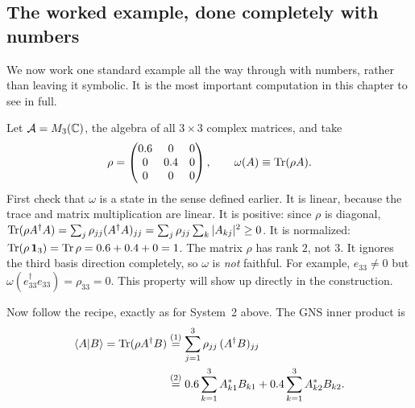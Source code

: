 \subsection*{The worked example, done completely with numbers}

We now work one standard example all the way through with numbers, rather than leaving it symbolic. It is
the most important computation in this chapter to see in full.

Let $\mathcal{A}=M_3(\mathbb C)$, the algebra of all $3\times3$ complex matrices, and take
\[
\rho = \begin{pmatrix}0.6&0&0\\0&0.4&0\\0&0&0\end{pmatrix} , \qquad \omega(A)\equiv\operatorname{Tr}(\rho A).
\]
First check that $\omega$ is a state in the sense defined earlier. It is linear, because the trace and matrix
multiplication are linear. It is positive: since $\rho$ is diagonal,
$\operatorname{Tr}(\rho A^\dagger A)=\sum_j\rho_{jj}(A^\dagger A)_{jj}=\sum_j\rho_{jj}\sum_k|A_{kj}|^2\ge0$. It is normalized:
$\operatorname{Tr}(\rho\,\mathbf{1}_3)=\operatorname{Tr}\rho=0.6+0.4+0=1$. The matrix $\rho$ has rank $2$, not $3$. It ignores the third basis
direction completely, so $\omega$ is \emph{not} faithful. For example, $e_{33}\ne0$ but
$\omega(e_{33}^\dagger e_{33})=\rho_{33}=0$. This property will show up directly in the construction.

Now follow the recipe, exactly as for System~2 above. The GNS inner product is
\begin{align}
\braket{A|B} = \operatorname{Tr}(\rho A^\dagger B)
&\overset{(1)}{=} \sum_{j=1}^3 \rho_{jj}\,(A^\dagger B)_{jj} \notag\\
&\overset{(2)}{=} 0.6\sum_{k=1}^3 A_{k1}^*B_{k1} + 0.4\sum_{k=1}^3 A_{k2}^*B_{k2} . \notag
\end{align}
\quad
{}

